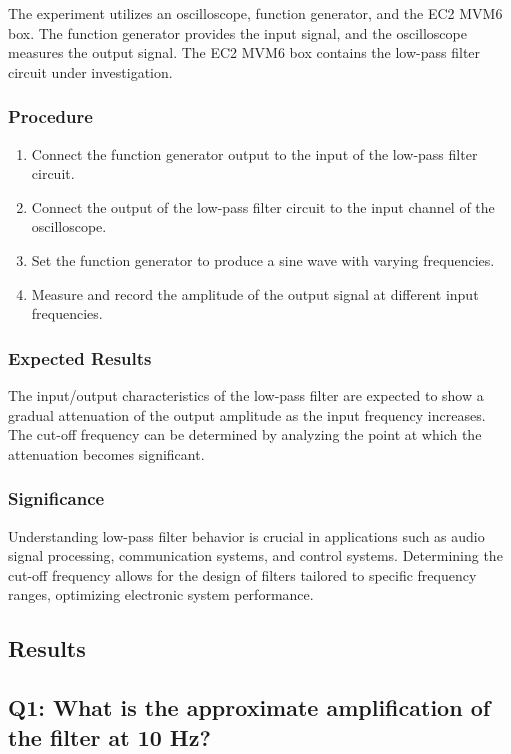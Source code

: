 The experiment utilizes an oscilloscope, function generator, and the EC2 MVM6 box. The function generator provides the input signal, and the oscilloscope measures the output signal. The EC2 MVM6 box contains the low-pass filter circuit under investigation.

\subsubsection*{Procedure}

\begin{enumerate}
    \item Connect the function generator output to the input of the low-pass filter circuit.
    \item Connect the output of the low-pass filter circuit to the input channel of the oscilloscope.
    \item Set the function generator to produce a sine wave with varying frequencies.
    \item Measure and record the amplitude of the output signal at different input frequencies.
\end{enumerate}


\subsubsection*{Expected Results}

The input/output characteristics of the low-pass filter are expected to show a gradual attenuation of the output amplitude as the input frequency increases. The cut-off frequency can be determined by analyzing the point at which the attenuation becomes significant.

\subsubsection*{Significance}

Understanding low-pass filter behavior is crucial in applications such as audio signal processing, communication systems, and control systems. Determining the cut-off frequency allows for the design of filters tailored to specific frequency ranges, optimizing electronic system performance.


\subsection{Results}
\subsection*{Q1: What is the approximate amplification of the filter at 10 Hz?}

